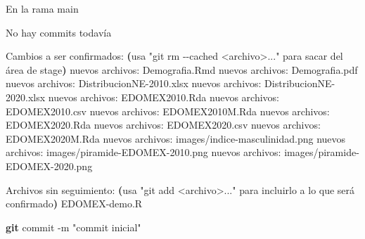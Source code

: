 \documentclass[
]{book}
\newenvironment{Shaded}{\begin{snugshade}}{\end{snugshade}}
\newcommand{\AttributeTok}[1]{\textcolor[rgb]{0.13,0.29,0.53}{#1}}
\newcommand{\ExtensionTok}[1]{#1}
\newcommand{\FunctionTok}[1]{\textcolor[rgb]{0.13,0.29,0.53}{\textbf{#1}}}
\newcommand{\KeywordTok}[1]{\textcolor[rgb]{0.13,0.29,0.53}{\textbf{#1}}}
\newcommand{\NormalTok}[1]{#1}
\newcommand{\StringTok}[1]{\textcolor[rgb]{0.31,0.60,0.02}{#1}}
\begin{document}
\begin{Shaded}
\begin{Highlighting}[]
\ExtensionTok{En}\NormalTok{ la rama main}

\ExtensionTok{No}\NormalTok{ hay commits todavía}

\ExtensionTok{Cambios}\NormalTok{ a ser confirmados:}
  \KeywordTok{(}\ExtensionTok{usa} \StringTok{"git rm {-}{-}cached \textless{}archivo\textgreater{}..."}\NormalTok{ para sacar del área de stage}\KeywordTok{)}
    \ExtensionTok{nuevos}\NormalTok{ archivos: Demografia.Rmd}
    \ExtensionTok{nuevos}\NormalTok{ archivos: Demografia.pdf}
    \ExtensionTok{nuevos}\NormalTok{ archivos: DistribucionNE{-}2010.xlsx}
    \ExtensionTok{nuevos}\NormalTok{ archivos: DistribucionNE{-}2020.xlsx}
    \ExtensionTok{nuevos}\NormalTok{ archivos: EDOMEX2010.Rda}
    \ExtensionTok{nuevos}\NormalTok{ archivos: EDOMEX2010.csv}
    \ExtensionTok{nuevos}\NormalTok{ archivos: EDOMEX2010M.Rda}
    \ExtensionTok{nuevos}\NormalTok{ archivos: EDOMEX2020.Rda}
    \ExtensionTok{nuevos}\NormalTok{ archivos: EDOMEX2020.csv}
    \ExtensionTok{nuevos}\NormalTok{ archivos: EDOMEX2020M.Rda}
    \ExtensionTok{nuevos}\NormalTok{ archivos: images/indice{-}masculinidad.png}
    \ExtensionTok{nuevos}\NormalTok{ archivos: images/piramide{-}EDOMEX{-}2010.png}
    \ExtensionTok{nuevos}\NormalTok{ archivos: images/piramide{-}EDOMEX{-}2020.png}

\ExtensionTok{Archivos}\NormalTok{ sin seguimiento:}
  \KeywordTok{(}\ExtensionTok{usa} \StringTok{"git add \textless{}archivo\textgreater{}..."}\NormalTok{ para incluirlo a lo que será confirmado}\KeywordTok{)}
    \ExtensionTok{EDOMEX{-}demo.R}
\end{Highlighting}
\end{Shaded}

\begin{Shaded}
\begin{Highlighting}[]
\FunctionTok{git}\NormalTok{ commit }\AttributeTok{{-}m} \StringTok{"commit inicial"}
\end{Highlighting}
\end{Shaded}
\end{document}
